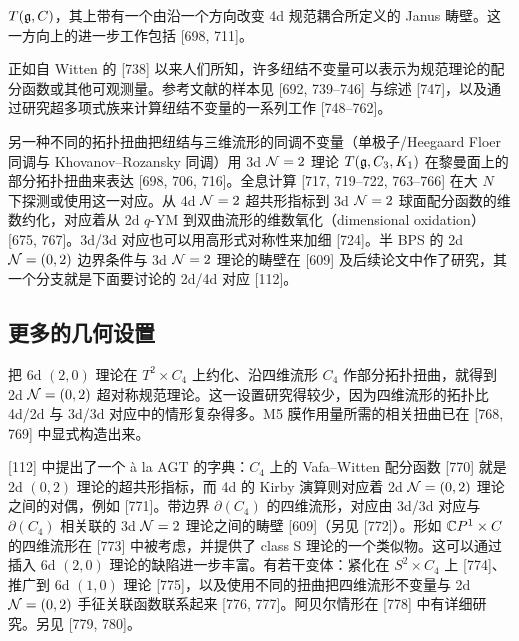 
$T(\mathfrak{g},C)$，其上带有一个由沿一个方向改变 4d 规范耦合所定义的 Janus 畴壁。这一方向上的进一步工作包括 [698, 711]。

正如自 Witten 的 [738] 以来人们所知，许多纽结不变量可以表示为规范理论的配分函数或其他可观测量。参考文献的样本见 [692, 739--746] 与综述 [747]，以及通过研究超多项式族来计算纽结不变量的一系列工作 [748--762]。

另一种不同的拓扑扭曲把纽结与三维流形的同调不变量（单极子/Heegaard Floer 同调与 Khovanov--Rozansky 同调）用 3d $\mathcal{N}=2$ 理论 $T(\mathfrak{g},C_3,K_1)$ 在黎曼面上的部分拓扑扭曲来表达 [698, 706, 716]。全息计算 [717, 719--722, 763--766] 在大 $N$ 下探测或使用这一对应。从 4d $\mathcal{N}=2$ 超共形指标到 3d $\mathcal{N}=2$ 球面配分函数的维数约化，对应着从 2d $q$-YM 到双曲流形的维数氧化（dimensional oxidation）[675, 767]。3d/3d 对应也可以用高形式对称性来加细 [724]。半 BPS 的 2d $\mathcal{N}=(0,2)$ 边界条件与 3d $\mathcal{N}=2$ 理论的畴壁在 [609] 及后续论文中作了研究，其一个分支就是下面要讨论的 2d/4d 对应 [112]。

\subsection{更多的几何设置}

把 6d $(2,0)$ 理论在 $T^2\times C_4$ 上约化、沿四维流形 $C_4$ 作部分拓扑扭曲，就得到 2d $\mathcal{N}=(0,2)$ 超对称规范理论。这一设置研究得较少，因为四维流形的拓扑比 4d/2d 与 3d/3d 对应中的情形复杂得多。M5 膜作用量所需的相关扭曲已在 [768, 769] 中显式构造出来。

[112] 中提出了一个 à la AGT 的字典：$C_4$ 上的 Vafa--Witten 配分函数 [770] 就是 2d $(0,2)$ 理论的超共形指标，而 4d 的 Kirby 演算则对应着 2d $\mathcal{N}=(0,2)$ 理论之间的对偶，例如 [771]。带边界 $\partial(C_4)$ 的四维流形，对应由 3d/3d 对应与 $\partial(C_4)$ 相关联的 3d $\mathcal{N}=2$ 理论之间的畴壁 [609]（另见 [772]）。形如 $\mathbb{C} P^1\times C$ 的四维流形在 [773] 中被考虑，并提供了 class S 理论的一个类似物。这可以通过插入 6d $(2,0)$ 理论的缺陷进一步丰富。有若干变体：紧化在 $S^2\times C_4$ 上 [774]、推广到 6d $(1,0)$ 理论 [775]，以及使用不同的扭曲把四维流形不变量与 2d $\mathcal{N}=(0,2)$ 手征关联函数联系起来 [776, 777]。阿贝尔情形在 [778] 中有详细研究。另见 [779, 780]。

